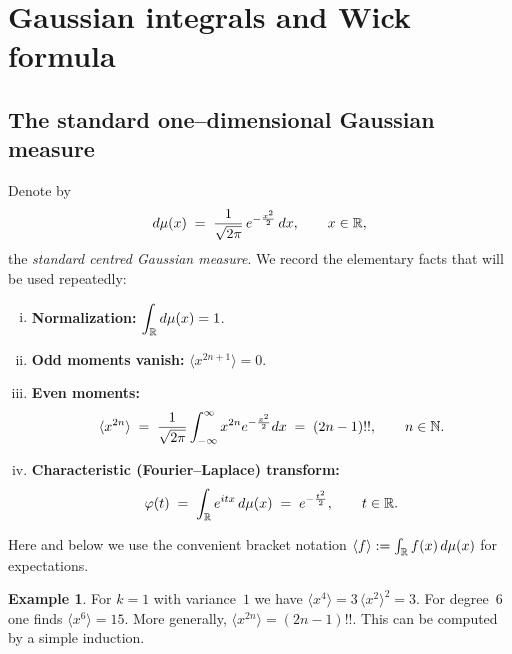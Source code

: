 \documentclass[letterpaper,11pt,oneside,reqno]{book}
\numberwithin{equation}{chapter}  %
\theoremstyle{definition}
\newtheorem{example}[proposition]{Example}
\begin{document}
\section{Gaussian integrals and Wick formula}

\label{lecture15:sec:gaussian-wick}

\subsection{The standard one–dimensional Gaussian measure}
\label{lecture15:subsec:1d-gaussian}

Denote by
\[
  d\mu(x)\;=\;\frac{1}{\sqrt{2\pi}}\,
               e^{-\frac{x^{2}}{2}}\,dx,
  \qquad x\in\Bbb R,
\]
the \emph{standard centred Gaussian measure}.
We record the elementary facts that will be used repeatedly:

\begin{enumerate}[(i)]
  \item \textbf{Normalization:}
        $\displaystyle\int_{\Bbb R}d\mu(x)=1$.

  \item \textbf{Odd moments vanish:}
        $\langle x^{2n+1}\rangle=0$.

  \item \textbf{Even moments:}
        \[
          \langle x^{2n}\rangle
          \;=\;
          \frac{1}{\sqrt{2\pi}}
          \int_{-\infty}^{\infty}
            x^{2n}e^{-\frac{x^{2}}{2}}dx
          \;=\;(2n-1)!!,
          \qquad n\in\Bbb N.
        \]

  \item \textbf{Characteristic (Fourier–Laplace) transform:}
        \[
          \varphi(t)
          \;=\;
          \int_{\Bbb R}e^{itx}\,d\mu(x)
          \;=\;
          e^{-\frac{t^{2}}{2}},
          \qquad t\in\Bbb R.
        \]
\end{enumerate}
Here and below we use the convenient bracket notation
\(
  \langle f\rangle:=\int_{\Bbb R}f(x)\,d\mu(x)
\)
for expectations.



\begin{example}
\label{lecture15:ex:x4}
For $k=1$ with variance~$1$ we have
\(
  \langle x^{4}\rangle
  = 3\,\langle x^{2}\rangle^{2}=3.
\)
For degree $6$ one finds
\(
  \langle x^{6}\rangle = 15.
\)
More generally,
$\langle x^{2n}\rangle=(2n-1)!!$.
This can be computed by a simple induction.
\end{example}
\end{document}

